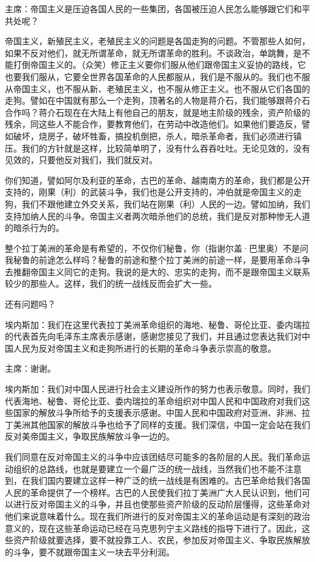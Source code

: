 主席：帝国主义是压迫各国人民的一些集团，各国被压迫人民怎么能够跟它们和平共处呢？

帝国主义，新殖民主义，老殖民主义的问题是各国走狗的问题。不管那些人如何，如果不反对他们，就无所谓革命，就无所谓革命的胜利。不谈政治，单跳舞，是不能打倒帝国主义的。（众笑）修正主义要你们服从他们跟帝国主义妥协的路线，它也要我们服从，它要全世界各国革命的人民都服从，我们是不服从的。我们也不服从帝国主义，也不服从新、老殖民主义，也不服从修正主义。也不服从它们各国的走狗。譬如在中国就有那么一个走狗，顶著名的人物是蒋介石，我们能够跟蒋介石合作吗？蒋介石现在在大陆上有他自己的朋友，就是地主阶级的残余，资产阶级的残余，同这些人不能合作，要教育他们，在劳动中改造他们。如果他们要造反，譬如破坏，烧房子，破坏牲畜，搞投机倒把，杀人，暗杀革命者，我们必须进行镇压。我们的方针就是这样，比较简单明了，没有什么吞吞吐吐。无论见效的，没有见效的，只要他反对我们，我们就反对。

你们知道，譬如阿尔及利亚的革命，古巴的革命、越南南方的革命，我们都是公开支持的，刚果（利）的武装斗争，我们也是公开支持的，冲伯就是帝国主义的走狗，我们不跟他建立外交关系，我们站在刚果（利）人民的一边。譬如加纳，我们支持加纳人民的斗争。帝国主义者两次暗杀他们的总统，我们是反对那种惨无人道的暗杀行为的。

整个拉丁美洲的革命是有希望的，不仅你们秘鲁，你（指谢尔盖·巴里奥）不是问我秘鲁的前途怎么样吗？秘鲁的前途和整个拉丁美洲的前途一样，是要用革命斗争去推翻帝国主义同它的走狗。我说的是大的、忠实的走狗，而不是跟帝国主义联系较少的那些人。这样，我们的统一战线反而会扩大一些。

还有问题吗？

埃内斯加：我们在这里代表拉丁美洲革命组织的海地、秘鲁、哥伦比亚、委内瑞拉的代表首先向毛泽东主席表示感谢，感谢您接见了我们，并且通过您表达我们对中国人民为反对帝国主义和走狗所进行的长期的革命斗争表示崇高的敬意。

主席：谢谢。

埃内斯加：我们对中国人民进行社会主义建设所作的努力也表示敬意。同时，我们代表海地、秘鲁、哥伦比亚、委内瑞拉的革命组织对中国人民和中国政府对我们这些国家的解放斗争所给予的支援表示感谢。中国人民和中国政府对亚洲、非洲、拉丁美洲其他国家的解放斗争也给予了同样的支援。我们深信，中国一定会站在我们反对美帝国主义，争取民族解放斗争一边的。

我们同意在反对帝国主义的斗争中应该团结尽可能多的各阶层的人民。我们革命运动组织的总路线，也就是要建立一个最广泛的统一战线，当然我们也不能不注意到，在我们国内要建立这样一种广泛的统一战线是有困难的。古巴革命给我们各国人民的革命提供了一个榜样。古巴的人民使我们拉丁美洲广大人民认识到，他们可以进行反对帝国主义的斗争，并且也使那些资产阶级的反动阶层懂得，这些革命对他们来说意味着什么。现在我们所进行的反对帝国主义的革命运动是有深刻的政治意义的，现在这些革命运动已经在马克思列宁主义路线的指导下进行了。因此，这些资产阶级就要选择，要不就投靠工人、农民，参加反对帝国主义、争取民族解放的斗争，要不就跟帝国主义一块去平分利润。

